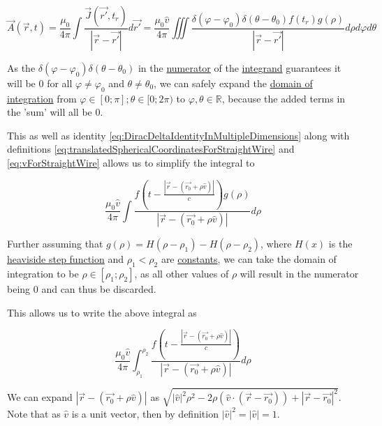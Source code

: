 ﻿\documentclass{article}
\begin{document}
\begin{equation*}
    \vec{A}(\vec{r}, t) = \frac{\mu_0}{4 \pi} \int \frac{\vec{J}(\vec{r'}, t_r)}{|\vec{r} - \vec{r'}|} d \vec{r'} = \frac{\mu_0 \hat{v}}{4 \pi} \iiint \frac{\delta(\varphi - \varphi_0) \delta(\theta - \theta_0) f(t_r) g(\rho)}{|\vec{r} - \vec{r'}|} d \rho d \varphi d \theta
\end{equation*}

As the $\delta(\varphi - \varphi_0) \delta(\theta - \theta_0)$ in the \href{https://en.wikipedia.org/wiki/Fraction}{numerator} of the \href{https://en.wikipedia.org/wiki/Integral#Terminology_and_notation}{integrand} guarantees it will be $0$ for all $\varphi \neq \varphi_0$ and $\theta \neq \theta_0$, we can safely expand the \href{https://en.wikipedia.org/wiki/Integral}{domain of integration} from $\varphi \in [0; \pi]; \theta \in [0; 2 \pi)$ to $\varphi, \theta \in \mathbb{R}$, because the added terms in the 'sum' will all be $0$.

This as well as identity \ref{eq:DiracDeltaIdentityInMultipleDimensions} along with definitions \ref{eq:translatedSphericalCoordinatesForStraightWire} and \ref{eq:vForStraightWire} allows us to simplify the integral to

\begin{equation*}
    \frac{\mu_0 \hat{v}}{4 \pi} \int \frac{f(t - \frac{|\vec{r} - (\vec{r_0} + \rho \hat{v})|}{c}) g(\rho)}{|\vec{r} - (\vec{r_0} + \rho \hat{v})|} d \rho
\end{equation*}

Further assuming that $g(\rho) = H(\rho - \rho_1) - H(\rho - \rho_2)$, where $H(x)$ is the \href{https://en.wikipedia.org/wiki/Heaviside_step_function}{heaviside step function} and $\rho_1 < \rho_2$ are \href{https://en.wikipedia.org/wiki/Constant_(mathematics)}{constants}, we can take the domain of integration to be $\rho \in [\rho_1; \rho_2]$, as all other values of $\rho$ will result in the numerator being $0$ and can thus be discarded.

This allows us to write the above integral as

\begin{equation*}
    \frac{\mu_0 \hat{v}}{4 \pi} \int_{\rho_1}^{\rho_2} \frac{f(t - \frac{|\vec{r} - (\vec{r_0} + \rho \hat{v})|}{c})}{|\vec{r} - (\vec{r_0} + \rho \hat{v})|} d \rho
\end{equation*}

We can expand $|\vec{r} - (\vec{r_0} + \rho \hat{v})|$ as $\sqrt{|\hat{v}|^2 \rho^2 - 2 \rho (\hat{v} \cdot (\vec{r} - \vec{r_0})) + |\vec{r} - \vec{r_0}|^2}$. Note that as $\hat{v}$ is a unit vector, then by definition $|\hat{v}|^2 = |\hat{v}| = 1$.
\end{document}
